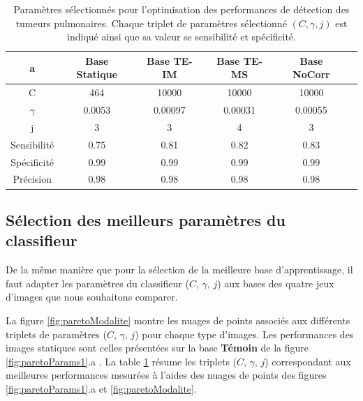 \begin{table}[h!]
	\begin{center}
		\begin{tabular}{c| c c c c c}
  \hline
  a	& Base Statique	& Base TE-IM	& Base TE-MS	& Base NoCorr	\\
  \hline
 C 	& 464		& 10000		& 10000		& 10000		\\
\hline
$\gamma$& 0.0053	& 0.00097	& 0.00031	& 0.00055	\\
\hline
j	& 3		& 3		& 4		& 3		\\
\hline
\hline
Sensibilité& 0.75	& 0.81		& 0.82		& 0.83	\\
\hline
Spécificité& 0.99	& 0.99		& 0.99		& 0.99		\\
\hline
Précision& 0.98		& 0.98		& 0.98		& 0.98		\\
\hline
 		\end{tabular}

	\end{center}
\caption[Paramètres sélectionnés pour l'optimisation des performances de détection des tumeurs pulmonaires]{Paramètres sélectionnés pour l'optimisation des performances de détection des tumeurs pulmonaires. Chaque triplet de paramètres sélectionné $(C,\gamma,j)$ est indiqué ainsi que sa valeur se sensibilité et spécificité.}
\label{tab:paramsModPoumon}
\end{table}

\subsection{Sélection des meilleurs paramètres du classifieur}

De la même manière que pour la sélection de la meilleure base d'apprentissage, il faut adapter les paramètres du classifieur ($C$, $\gamma$, $j$) aux bases des quatre jeux d'images que nous souhaitons comparer.

La figure \ref{fig:paretoModalite} montre les nuages de points associés aux différents triplets de paramètres ($C$, $\gamma$, $j$) pour chaque type d'images. Les performances des images statiques sont celles présentées sur la base \textbf{Témoin} de la figure \ref{fig:paretoParams1}.a . La table \ref{tab:paramsModPoumon} résume les triplets ($C$, $\gamma$, $j$) correspondant aux meilleures performances mesurées à l'aides des nuages de points des figures \ref{fig:paretoParams1}.a et \ref{fig:paretoModalite}.


